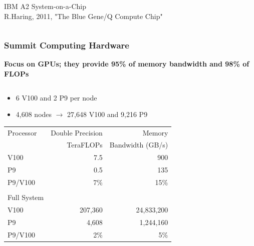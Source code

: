 \documentclass[aspectratio=169]{beamer}
\begin{document}
\begin{frame}
\begin{columns}
\begin{column}{0.3\textwidth}
      \small{IBM A2 System-on-a-Chip} \\
      \tiny{R.Haring, 2011, "The Blue Gene/Q Compute Chip"}
    \end{column}
  \end{columns}
\end{frame}

\begin{frame}
  \frametitle{Summit Computing Hardware}
  \textbf{Focus on GPUs; they provide 95\% of memory bandwidth and 98\% of FLOPs}
    \begin{columns}
    \begin{column}{0.7\textwidth}
  \begin{itemize}
    \item 6 V100 and 2 P9 per node
    \item 4,608 nodes $\rightarrow$ 27,648 V100 and 9,216 P9
  \end{itemize}
  {
  \begin{table}[]
    \begin{tabular}{lrr}
      Processor   & Double Precision & Memory           \\
                  & TeraFLOPs        & Bandwidth (GB/s) \\
      V100        & 7.5              & 900              \\
      P9          & 0.5              & 135       \\
      P9/V100     & 7\%              & 15\% \\
      \\
      Full System &                  & \\
      V100        & 207,360          & 24,833,200       \\
      P9          & 4,608            & 1,244,160       \\
      P9/V100     & 2\%              & 5\%
    \end{tabular}
  \end{table}
  }
    \end{column}
    \begin{column}{0.3\textwidth}
      \begin{figure}
        \centering

\end{figure}
\end{column}
\end{columns}
\end{frame}
\end{document}
